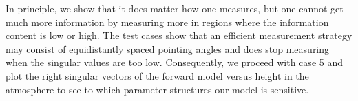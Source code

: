 
In principle, we show that it does matter how one measures, but one cannot get much more information by measuring more in regions where the information content is low or high.
The test cases show that an efficient measurement strategy may consist of equidistantly spaced pointing angles and does stop measuring when the singular values are too low. 
Consequently, we proceed with case 5 and plot the right singular vectors of the forward model versus height in the atmosphere to see to which parameter structures our model is sensitive.

